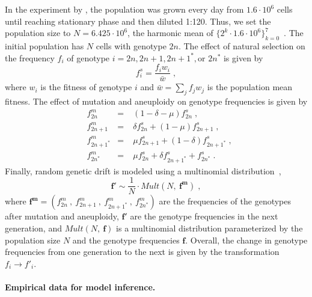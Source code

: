 \documentclass[12pt]{article}
\let\vec\mathbf
\newcommand{\euwt}{\emph{$2n$}}
\begin{document}
In the experiment by \citet{Yona2012}, the population was grown every day from $1.6 \cdot 10^6$ cells until reaching stationary phase and then diluted 1:120.
Thus, we set the population size to $N=6.425 \cdot 10^6$, the harmonic mean of $\{2^k \cdot 1.6 \cdot 10^6\}_{k=0}^{7}$~\citep{Crow1970}.
The initial population has $N$ cells with genotype \euwt. 
The effect of natural selection on the frequency $f_i$ of genotype $i = 2n, 2n+1, 2n+1^*, \text{or } 2n^*$ is given by
    \begin{equation} \label{eq:selection-single} 
      f^s_i = \frac{f_i w_i}{\bar{w}} \;,
    \end{equation}
where $w_i$ is the fitness of genotype $i$ and $\bar{w} = \sum_{j}{f_j w_j}$ is the population mean fitness.
The effect of mutation and aneuploidy on genotype frequencies is given by
    \begin{equation} \label{eq:mutation-aneuploidy-single}
    \begin{aligned}
      &f^m_{2n} &=&\; (1 - \delta - \mu) f^s_{2n}  \;,\\
      &f^m_{2n+1} &=&\; \delta f^s_{2n} + (1 - \mu) f^s_{2n+1}  \;,\\
      &f^m_{2n+1^*} &=&\; \mu f^s_{2n+1} + (1-\delta) f^s_{2n+1^*}  \;,\\
      &f^m_{2n^*} &=&\; \mu f^s_{2n} + \delta f^s_{2n+1^*} + f^s_{2n^*}  \;.
    \end{aligned}
    \end{equation}
Finally, random genetic drift is modeled using a multinomial distribution~\citep{Otto2007},
    \begin{equation} \label{eq:drift-single}
      \vec{f'} \sim \frac{1}{N} \cdot \mathit{Mult}(N,\ \vec{f^m}) \;,
    \end{equation}
where $\vec{f^m}=(f^m_{2n}\ ,\ f^m_{2n+1}\ ,\ f^m_{2n+1^*}\ ,\ f^m_{2n^*})$ are the frequencies of the genotypes after mutation and aneuploidy, $\vec{f'}$ are the genotype frequencies in the next generation, and $Mult(N,\ \vec{f})$ is a multinomial distribution parameterized by the population size $N$ and the genotype frequencies $\vec{f}$.
Overall, the change in genotype frequencies from one generation to the next is given by the transformation $f_i \to f'_i$.

\paragraph{Empirical data for model inference.}
\end{document}

